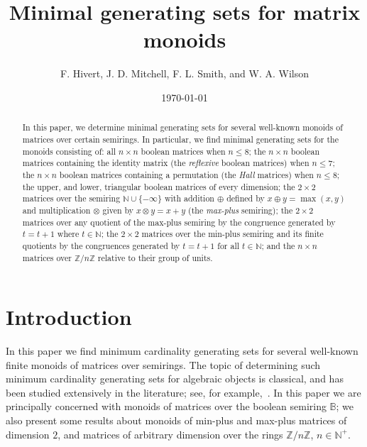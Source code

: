 \documentclass[11pt]{article}
\title{Minimal generating sets for matrix monoids}
\author{F. Hivert, J. D. Mitchell, F. L. Smith, and W. A. Wilson}
\date{\today}
\numberwithin{equation}{section}
\newcommand{\B}{\mathbb{B}}
\newcommand{\N}{\mathbb{N}}
\newcommand{\Np}{\N^{+}}
\newcommand{\Z}{\mathbb{Z}}
\begin{document}
\maketitle

\begin{abstract}
  In this paper, we determine minimal generating sets for several well-known monoids of 
  matrices over certain semirings. In particular, 
  we find minimal generating sets for the monoids consisting of: all $n\times n$
  boolean matrices when $n\leq 8$; the $n\times n$ boolean matrices containing
  the identity matrix (the \textit{reflexive} boolean matrices) when $n\leq 7$;
  the $n\times n$ boolean matrices containing a permutation (the \textit{Hall}
  matrices) when $n \leq 8$; the upper, and lower, triangular boolean matrices
  of every dimension; the $2 \times 2$ matrices over the semiring $\N \cup
  \{-\infty\}$ with addition $\oplus$ defined by $x\oplus y = \max(x, y)$ and
  multiplication $\otimes$ given by $x\otimes y = x + y$ (the \textit{max-plus}
  semiring); the $2\times 2$ matrices over any quotient of the max-plus semiring
  by the congruence generated by $t = t + 1$ where $t\in \N$; the $2\times
  2$ matrices over the min-plus semiring and its finite quotients by the
  congruences generated by $t = t + 1$ for all $t\in \N$; and the $n \times n$
  matrices over $\Z / n\Z$ relative to their group of units.
\end{abstract}

\tableofcontents

\section{Introduction}

In this paper we find minimum cardinality generating sets for several well-known
finite monoids of matrices over semirings. The topic of determining such
minimum cardinality generating sets for algebraic objects is classical, and has
been studied extensively in the literature; see, for
example,~\cite{Branco2019aa, Colarte2020aa, DallaVolta1995aa, Dimitrova2020aa,
  Gelander2020aa, Holt2013aa, Moori1993aa, Rosenberger1988aa}.  In this
paper we are principally concerned with monoids of matrices over the boolean
semiring $\B$; we also present some results about monoids of min-plus and
max-plus matrices of dimension $2$, and matrices of arbitrary dimension over the
rings $\Z / n\Z$, $n\in \Np$.
\end{document}
